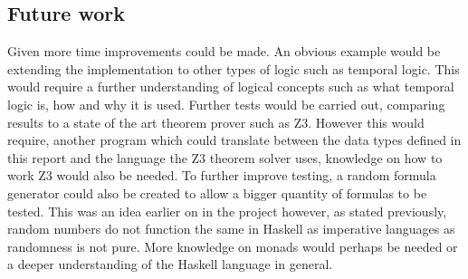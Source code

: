 \documentclass{article}%
\begin{document}
\subsection{Future work}
Given more time improvements could be made. An obvious example would be extending the implementation to other types of logic such as temporal logic. This would require a further understanding of logical concepts such as what temporal logic is, how and why it is used. Further tests would be carried out, comparing results to a state of the art theorem prover such as Z3. However this would require, another program which could translate between the data types defined in this report and the language the Z3 theorem solver uses, knowledge on how to work Z3 would also be needed. To further improve testing, a random formula generator could also be created to allow a bigger quantity of formulas to be tested. This was an idea earlier on in the project however, as stated previously, random numbers do not function the same in Haskell as imperative languages as randomness is not pure. More knowledge on monads would perhaps be needed or a deeper understanding of the Haskell language in general. 
\end{document}
